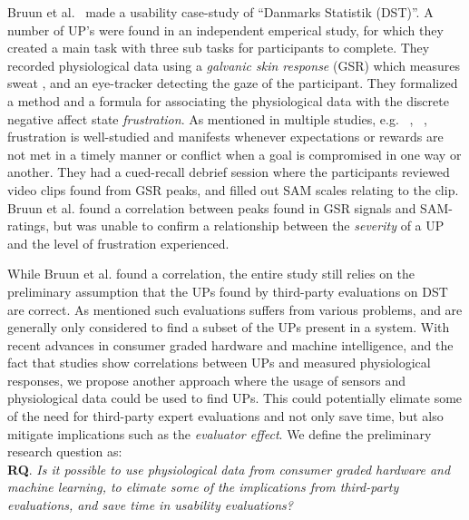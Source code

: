 Bruun et al.~\cite{LH-paper} made a usability case-study of ``Danmarks Statistik (DST)''.
A number of UP's were found in an independent emperical study, for which they created a main task with three sub tasks for participants to complete.
They recorded physiological data using a \textit{galvanic skin response} (GSR) which measures sweat \cite{gsr_calibration}, and an eye-tracker detecting the gaze of the participant.
They formalized a method and a formula for associating the physiological data with the discrete negative affect state \textit{frustration}.
As mentioned in multiple studies, e.g. ~\cite{LH-paper}, ~\cite{frustration_with_computers}, frustration is well-studied
and manifests whenever expectations or rewards are not met in a timely manner or conflict when a goal is compromised in one way or another.
They had a cued-recall debrief session where the participants reviewed video clips found from GSR peaks, and filled out SAM scales relating to the clip. 
Bruun et al. found a correlation between peaks found in GSR signals and SAM-ratings, but was unable to confirm a relationship between the
\textit{severity} of a UP and the level of frustration experienced.

While Bruun et al. found a correlation, the entire study still relies on the preliminary assumption that the UPs found by third-party evaluations on DST are correct. 
As mentioned such evaluations suffers from various problems, and are generally only considered to find a subset of the UPs present in a system. 
With recent advances in consumer graded hardware and machine intelligence, and the fact that studies show correlations between UPs and measured physiological responses, we propose another approach where the usage of sensors and physiological data could be used to find UPs.
This could potentially elimate some of the need for third-party expert evaluations and not only save time, but also mitigate implications such as the \textit{evaluator effect}\cite{eval_effect}.
We define the preliminary research question as:\\

\textbf{RQ}. \textit{Is it possible to use physiological data from consumer graded hardware and machine learning, to
  elimate some of the implications from third-party evaluations, and save time in usability evaluations?}


